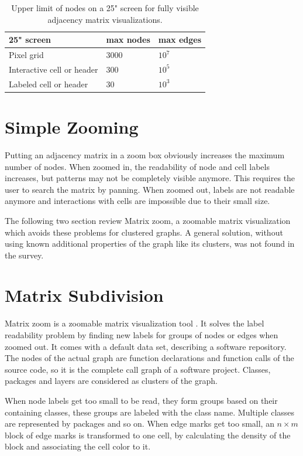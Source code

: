  
\begin{table}[]
\centering
\begin{tabular}{|l|l|l|}
\hline
25" screen                 & max nodes & max edges                \\ \hline
Pixel grid                 & 3000      & $10^7$                     \\ \hline
Interactive cell or header & 300       & $10^5$                     \\ \hline
Labeled cell or header     & 30        & $10^3$                     \\ \hline
\end{tabular}
\caption{Upper limit of nodes on a 25" screen for fully visible adjacency matrix visualizations.}
\label{my-label}
\end{table}



\section{Simple Zooming}
Putting an adjacency matrix in a zoom box obviously increases the maximum number of nodes. 
When zoomed in, the readability of node and cell labels increases, but patterns may not be completely visible anymore. This requires the user to search the matrix by panning. When zoomed out, labels are not readable anymore and interactions with cells are impossible due to their small size. 

The following two section review Matrix zoom, a zoomable matrix visualization which avoids these problems for clustered graphs. A general solution, without using known additional properties of the graph like its clusters, was not found in the survey.

\section{Matrix Subdivision}

Matrix zoom is a zoomable matrix visualization tool \citep{ham-ivis-2003}. It solves the label readability problem by finding new labels for groups of nodes or edges when zoomed out. It comes with a default data set, describing a software repository. The nodes of the actual graph are function declarations and function calls of the source code, so it is the complete call graph of a software project. Classes, packages and layers are considered as clusters of the graph. 

When node labels get too small to be read, they form groups based on their containing classes, these groups are labeled with the class name. Multiple classes are represented by packages and so on. When edge marks get too small, an $n \times m$ block of edge marks is transformed to one cell, by calculating the density of the block and associating the cell color to it.

